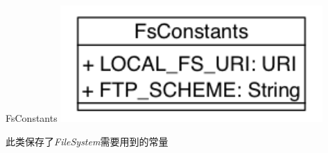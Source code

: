 \begin{XeClass}{FsConstants}
\includegraphics[width=10cm]{cdig/FsConstants.png}
     
 此类保存了\emph{FileSystem}需要用到的常量

\end{XeClass}
